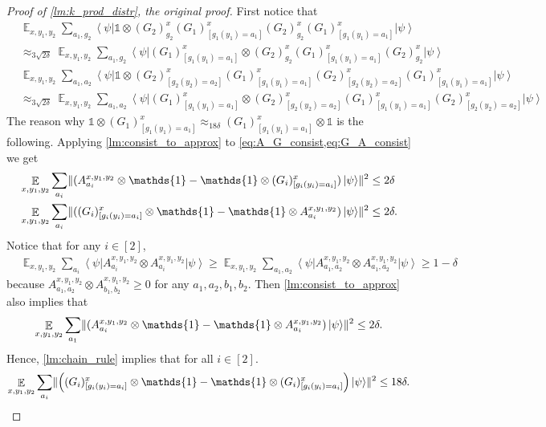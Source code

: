 \documentclass[10pt,a4paper]{article}
\theoremstyle{plain}
\theoremstyle{definition}
\DeclarePairedDelimiter{\norm}{\lVert}{\rVert}
\newcommand {\bra} [1] {\ensuremath{ \left\langle #1 \right| }}
\newcommand {\ket} [1] {\ensuremath{ \left| #1 \right\rangle }}
\DeclareMathOperator*{\bigE}{\mathbb{E}}
\newcommand {\id} {\ensuremath{\mathds{1}}}
\newcommand{\x}{\otimes}
\newcommand{\appd}[1]{\approx_{#1}}
\newcommand{\1}{\mathbb{1}} %
\begin{document}
\begin{proof}[Proof of \cref{lm:k_prod_distr}, the original proof]
	First notice that 
	\begin{align*}
		&\bigE_{x,y_1,y_2} \sum_{a_1, g_2} \bra{\psi} 
		\id \x (G_2)^x_{g_2} (G_1)^x_{[g_1(y_1) = a_1]}   (G_2)^x_{g_2}  (G_1)^x_{[g_1(y_1) = a_1]}  \ket{\psi} \\
		 &\appd{ 3\sqrt{2\delta}}
		\bigE_{x,y_1,y_2} \sum_{a_1, g_2} \bra{\psi}(G_1)^x_{[g_1(y_1) = a_1]} \x  (G_2)^x_{g_2} (G_1)^x_{[g_1(y_1) = a_1]}   (G_2)^x_{g_2}  \ket{\psi} \\
		&\bigE_{x,y_1,y_2} \sum_{a_1, a_2} \bra{\psi}  \id \x 
		(G_2)^x_{[g_2(y_2) = a_2]} (G_1)^x_{[g_1(y_1) = a_1]}  (G_2)^x_{[g_2(y_2) = a_2]} (G_1)^x_{[g_1(y_1) = a_1]} \ket{\psi} \\
		& \appd{3\sqrt{2\delta}}  \bigE_{x,y_1,y_2} \sum_{a_1, a_2} \bra{\psi}  (G_1)^x_{[g_1(y_1) = a_1]} \x 
		(G_2)^x_{[g_2(y_2) = a_2]} (G_1)^x_{[g_1(y_1) = a_1]}  (G_2)^x_{[g_2(y_2) = a_2]}  \ket{\psi}
	\end{align*}
	The reason why $\id \x (G_1)^x_{[g_1(y_1) = a_1]} \appd{18\delta}  (G_1)^x_{[g_1(y_1) = a_1]} \x \id$ is the following.
	Applying \cref{lm:consist_to_approx} to \cref{eq:A_G_consist,eq:G_A_consist} we get
	\begin{align*}
		&\bigE_{x,y_1,y_2} \sum_{a_i} \norm{ (A^{x,y_1,y_2}_{a_i} \x \id - \id \x (G_i)^x_{[g_i(y_i)=a_i]})\ket{\psi}}^2 \leq 2\delta \\
		&\bigE_{x,y_1,y_2} \sum_{a_i} \norm{ ((G_i)^x_{[g_i(y_i)=a_i]} \x \id - \id \x  A^{x,y_1, y_2}_{a_i} )\ket{\psi}}^2 \leq 2\delta.
	\end{align*}
	Notice that for any $i \in [2]$, 
	\begin{align*}
		&\bigE_{x,y_1,y_2} \sum_{a_i}  \bra{\psi} A^{x,y_1, y_2}_{a_i} \x A^{x,y_1,y_2}_{a_i} \ket{\psi} \geq
		\bigE_{x,y_1,y_2} \sum_{a_1,a_2} \bra{\psi} A^{x,y_1, y_2}_{a_1,a_2} \x A^{x,y_1, y_2}_{a_1,a_2} \ket{\psi}
		\geq 1 - \delta 
	\end{align*}
	because $A^{x,y_1, y_2}_{a_1,a_2} \x A^{x,y_1, y_2}_{b_1,b_2} \geq 0$ for any $a_1, a_2,b_1,b_2$.
	Then \cref{lm:consist_to_approx} also implies that 
	\begin{align*}
		\bigE_{x,y_1,y_2} \sum_{a_1} \norm{ (A^{x,y_1, y_2}_{a_i} \x \id - \id \x  A^{x,y_1, y_2}_{a_i})
		\ket{\psi}}^2 \leq 2 \delta.
	\end{align*}
	Hence, \cref{lm:chain_rule} implies that for all $i \in [2]$.
	\begin{align*}
		\bigE_{x,y_1,y_2} \sum_{a_i} \norm{ \Big( (G_i)^x_{[g_i(y_i)=a_i]} \x \id - \id \x (G_i)^x_{[g_i(y_i) = a_i]} \Big) \ket{\psi}}^2 \leq 18\delta.

\end{align*}
\end{proof}
\end{document}
